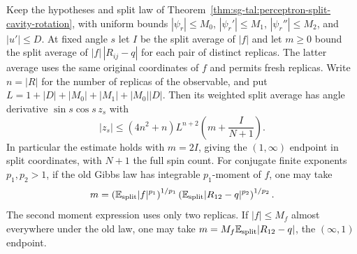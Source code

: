 \begin{theorem}\label{thm:sg-tal:perceptron-split-cavity-pair-bound}
  \leanok
Keep the hypotheses and split law of Theorem~\ref{thm:sg-tal:perceptron-split-cavity-rotation},
with uniform bounds $|\psi_r|\le M_0$, $|\psi_r'|\le M_1$, $|\psi_r''|\le M_2$, and
$|u'|\le D$. At fixed angle $s$ let $I$ be the split average of $|f|$ and let
$m\ge0$ bound the split average of $|f|\,|R_{ij}-q|$ for each pair of distinct
replicas. The latter average uses the same original coordinates of $f$ and permits fresh
replicas. Write $n=|R|$ for the number of replicas of the observable, and put
$L=1+|D|+|M_0|+|M_1|+|M_0||D|$. Then its weighted split average has angle derivative
$\sin s\cos s\,z_s$ with
\[
 |z_s|\le (4n^2+n)L^{n+2}\left(m+\frac{I}{N+1}\right).
\]
In particular the estimate holds with $m=2I$, giving the $(1,\infty)$ endpoint in split
coordinates, with $N+1$ the full spin count. For conjugate finite exponents
$p_1,p_2>1$, if the old Gibbs law has integrable $p_1$-moment of $f$, one may take
\[
 m=\left(\mathbb E_{\rm split}|f|^{p_1}\right)^{1/p_1}
   \left(\mathbb E_{\rm split}|R_{12}-q|^{p_2}\right)^{1/p_2}.
\]
The second moment expression uses only two replicas. If $|f|\le M_f$ almost
everywhere under the old law, one may take $m=M_f\mathbb E_{\rm split}|R_{12}-q|$,
the $(\infty,1)$ endpoint.
\end{theorem}
